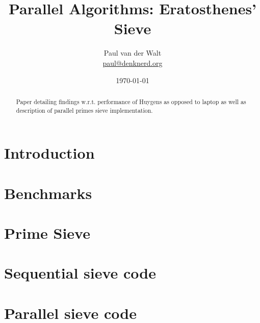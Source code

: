 \documentclass[a4paper]{article}
\author{Paul van der Walt\\\url{paul@denknerd.org}}
\date{\today}
\title{Parallel Algorithms: Eratosthenes' Sieve}
\begin{document}
\maketitle
\begin{abstract}
    Paper detailing findings w.r.t. performance of Huygens as opposed to laptop
    as well as description of parallel primes sieve implementation. 
\end{abstract}
\tableofcontents

\section{Introduction}

\section{Benchmarks}

\section{Prime Sieve}

\appendix
\section{Sequential sieve code}


\section{Parallel sieve code}

\end{document}
